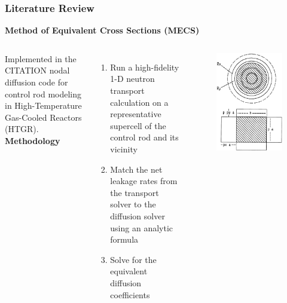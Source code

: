 \begin{frame}
  \frametitle{Literature Review}
  \textbf{Method of Equivalent Cross Sections (MECS)}
  \begin{columns}
    \column[t]{7cm}
    \vspace{.1cm}

    Implemented in the CITATION nodal diffusion code for control rod modeling in High-Temperature
    Gas-Cooled Reactors (HTGR). \\
    \textbf{Methodology}
    \begin{enumerate}
      \item Run a high-fidelity 1-D neutron transport calculation on a representative supercell of
        the control rod and its vicinity
      \item Match the net leakage rates from the transport solver to the diffusion solver using an
        analytic formula
      \item Solve for the equivalent diffusion coefficients
    \end{enumerate}
    \column[t]{4cm}
    \begin{figure}
      \centering
      \includegraphics[width=.75\columnwidth]{../images/mecs-geometry}

\end{figure}
\end{columns}
\end{frame}
